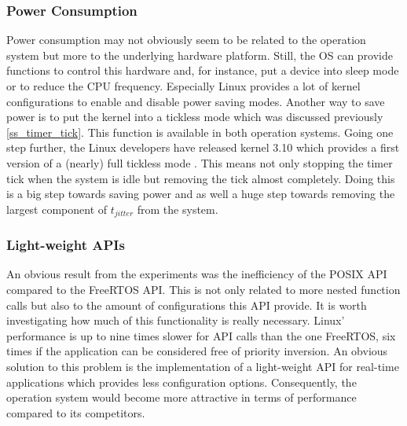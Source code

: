 \subsubsection{Power Consumption}
Power consumption may not obviously seem to be related to the operation system but more to the underlying hardware platform.
Still, the \ac{OS} can provide functions to control this hardware and, for instance, put a device into sleep mode or to reduce the \ac{CPU} frequency.
Especially Linux provides a lot of kernel configurations to enable and disable power saving modes.
Another way to save power is to put the kernel into a tickless mode which was discussed previously \ref{ss_timer_tick}.
This function is available in both operation systems.
Going one step further, the Linux developers have released kernel 3.10 which provides a first version of a (nearly) full tickless mode \cite{corbet:nftoi}.
This means not only stopping the timer tick when the system is idle but removing the tick almost completely. 
Doing this is a big step towards saving power and as well a huge step towards removing the largest component of $t_{jitter}$ from the system.

\subsubsection{Light-weight APIs}
An obvious result from the experiments was the inefficiency of the POSIX \ac{API} compared to the FreeRTOS \ac{API}.
This is not only related to more nested function calls but also to the amount of configurations this \ac{API} provide.
It is worth investigating how much of this functionality is really necessary.
Linux' performance is up to nine times slower for \ac{API} calls than the one FreeRTOS, six times if the application can be considered free of priority inversion.
An obvious solution to this problem is the implementation of a light-weight \ac{API} for real-time applications which provides less configuration options.
Consequently, the operation system would become more attractive in terms of performance compared to its competitors.